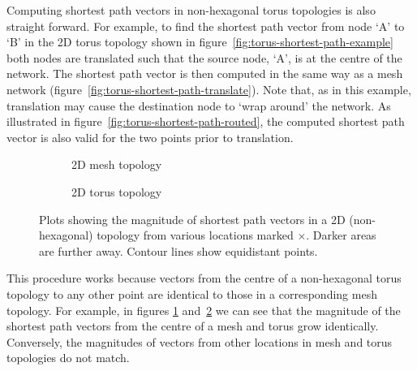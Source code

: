 			Computing shortest path vectors in non-hexagonal torus topologies is also
			straight forward. For example, to find the shortest path vector from node
			`A' to `B' in the 2D torus topology shown in figure~\ref{fig:torus-shortest-path-example} both nodes are translated such that
			the source node, `A', is at the centre of the network. The shortest path
			vector is then computed in the same way as a mesh network (figure~\ref{fig:torus-shortest-path-translate}). Note that, as in this example,
			translation may cause the destination node to `wrap around' the network.
			As illustrated in figure~\ref{fig:torus-shortest-path-routed}, the
			computed shortest path vector is also valid for the two points prior to
			translation.
			
			\begin{figure}
				\center
				
				\begin{subfigure}{\linewidth}
					\center
					\caption{2D mesh topology}
					\label{fig:distance-map-mesh}
				\end{subfigure}
				
				\vspace{1em}
				
				\begin{subfigure}{\linewidth}
					\center
					\caption{2D torus topology}
					\label{fig:distance-map-torus}
				\end{subfigure}
				
				\caption[Magnitudes of shortest path vectors in a 2D mesh.]%
				{Plots showing the magnitude of shortest path vectors in a 2D
				(non-hexagonal) topology from various locations marked
				{\color{red}$\times$}.  Darker areas are further away. Contour lines show
				equidistant points.}
				
				\label{fig:distance-map}
			\end{figure}
			
			This procedure works because vectors from the centre of a non-hexagonal
			torus topology to any other point are identical to those in a
			corresponding mesh topology. For example, in figures
			\ref{fig:distance-map-mesh} and~\ref{fig:distance-map-torus} we can see
			that the magnitude of the shortest path vectors from the centre of a mesh
			and torus grow identically. Conversely, the magnitudes of vectors from
			other locations in mesh and torus topologies do not match.
		
